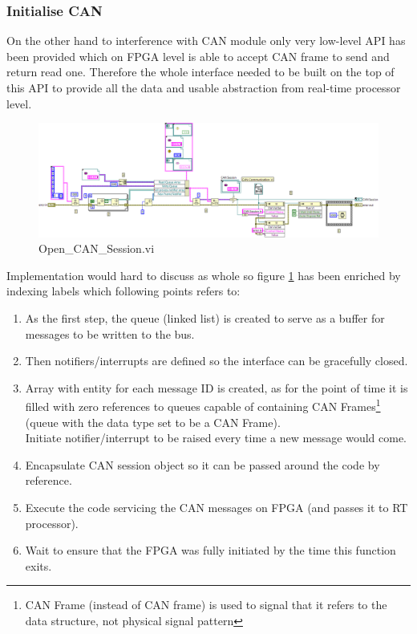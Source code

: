 \subsubsection{Initialise CAN}
On the other hand to interference with CAN module only very low-level API has been provided which on FPGA level is able to accept CAN frame to send and return read one. Therefore the whole interface needed to be built on the top of this API to provide all the data and usable abstraction from real-time processor level.
\begin{figure}[h]
    \centering
    \includegraphics[width=\textwidth]{figures/Open_CAN_Sessiond}
    \caption{Open\_CAN\_Session.vi}
    \label{vi:Open_CAN_Session}
\end{figure}
Implementation would hard to discuss as whole so figure \ref{vi:Open_CAN_Session} has been enriched by indexing labels which following points refers to:
\begin{enumerate}
    \item As the first step, the queue (linked list) is created to serve as a buffer for messages to be written to the bus.
    \item Then notifiers/interrupts are defined so the interface can be gracefully closed.
    \item Array with entity for each message ID is created, as for the point of time it is filled with zero references to queues capable of containing CAN Frames\footnote{CAN Frame (instead of CAN frame) is used to signal that it refers to the data structure, not physical signal pattern} (queue with the data type set to be a CAN Frame).
    \\
    Initiate notifier/interrupt to be raised every time a new message would come.
    \item Encapsulate CAN session object so it can be passed around the code by reference.
    \item Execute the code servicing the CAN messages on FPGA (and passes it to RT processor).
    \item Wait to ensure that the FPGA was fully initiated by the time this function exits.
\end{enumerate}

